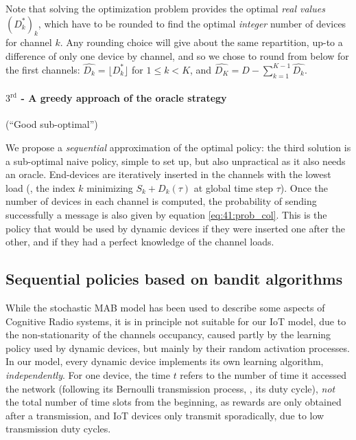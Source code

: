 Note that solving the optimization problem provides the optimal \emph{real values} $(D_k^*)_k$, which have to be rounded to find the optimal \emph{integer} number of devices for channel $k$.
Any rounding choice will give about the same repartition, up-to a difference of only one device by channel, and so we chose to round from below for the first channels:
%
$\widehat{D_k} = \lfloor D_k^* \rfloor$ for $1 \leq k < K$, and $\widehat{D_{K}} = D - \sum_{k=1}^{K - 1} \widehat{D_k}$.

\paragraph{$3^{\text{rd}}$ - A greedy approach of the oracle strategy} (``\textcolor{deeppurple}{Good sub-optimal}'')

We propose a \emph{sequential} approximation of the optimal policy:
the third solution is a sub-optimal naive policy, simple to set up, but also unpractical as it also needs an oracle.
End-devices are iteratively inserted in the channels with the lowest load (\ie, the index $k$ minimizing $S_k + D_k(\tau)$ at global time step $\tau$). Once the number of devices in each channel is computed, the probability of sending successfully a message is also given by equation \eqref{eq:41:prob_col}.
This is the policy that would be used by dynamic devices if they were inserted one after the other, and if they had a perfect knowledge of the channel loads.


\subsection{Sequential policies based on bandit algorithms}
\label{sub:41:sequentialPolicies}

While the stochastic MAB model has been used to describe some aspects of Cognitive Radio systems, it is in principle not suitable for our IoT model, due to the non-stationarity of the channels occupancy, caused partly by the learning policy used by dynamic devices, but mainly by their random activation processes.
%
In our model, every dynamic device implements its own learning algorithm, \emph{independently}.
For one device, the time $t$ refers to the number of time it accessed the network (following its Bernoulli transmission process, \ie, its duty cycle), \emph{not} the total number of time slots from the beginning, as rewards are only obtained after a transmission, and IoT devices only transmit sporadically, due to low transmission duty cycles.


